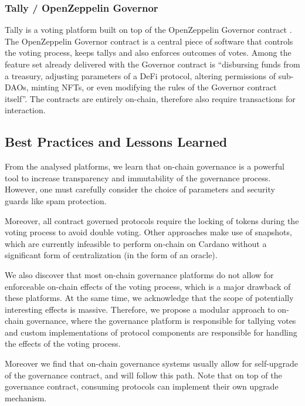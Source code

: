\documentclass[11pt]{article}
\begin{document}
\subsubsection{Tally / OpenZeppelin Governor}

Tally is a voting platform built on top of the OpenZeppelin Governor contract \cite{Tally, OpenZeppelin}.
The OpenZeppelin Governor contract is a central piece of software that controls the voting process, keeps tallys and also enforces outcomes of votes.
Among the feature set already delivered with the Governor contract is ``disbursing funds from a treasury, adjusting parameters of a DeFi protocol, altering permissions of sub-DAOs, minting NFTs, or even modifying the rules of the Governor contract itself''.
The contracts are entirely on-chain, therefore also require transactions for interaction.

\subsection{Best Practices and Lessons Learned}

From the analysed platforms, we learn that on-chain governance is a powerful tool to increase transparency and immutability of the governance process.
However, one must carefully consider the choice of parameters and security guards like spam protection.

Moreover, all contract governed protocols require the locking of tokens during the voting process to avoid double voting.
Other approaches make use of snapshots, which are currently infeasible to perform on-chain on Cardano
without a significant form of centralization (in the form of an oracle).

We also discover that most on-chain governance platforms do not allow for enforceable on-chain effects of the voting process,
which is a major drawback of these platforms.
At the same time, we acknowledge that the scope of potentially interesting effects is massive.
Therefore, we propose a modular approach to on-chain governance, where the governance platform is responsible for tallying votes and
custom implementations of protocol components are responsible for handling the effects of the voting process.

Moreover we find that on-chain governance systems usually allow for self-upgrade of the governance contract,
and will follow this path.
Note that on top of the governance contract,
consuming protocols can implement their own upgrade mechanism.
\end{document}
